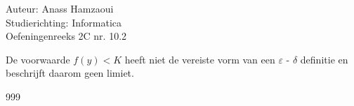 \documentclass[a4paper]{article}
\begin{document}
  
\noindent \large Auteur: Anass Hamzaoui \\
\noindent \large Studierichting: Informatica\\
\noindent \large Oefeningenreeks 2C nr. 10.2\\
\medskip
\normalsize


\noindent De voorwaarde $f(y) < K$ heeft niet de vereiste vorm van een $\varepsilon$ - $\delta$ definitie en beschrijft daarom geen limiet.


\begin{thebibliography}{999}
\end{thebibliography}
\end{document}
